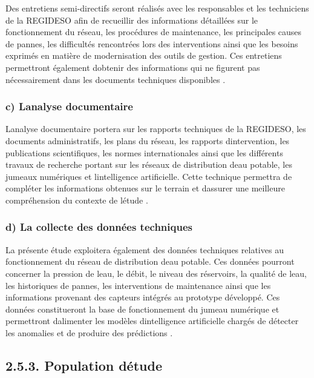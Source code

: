 \documentclass[12pt,a4paper,oneside]{report}
\begin{document}
Des entretiens semi-directifs seront réalisés avec les responsables et
les techniciens de la REGIDESO afin de recueillir des informations
détaillées sur le fonctionnement du réseau, les procédures de
maintenance, les principales causes de pannes, les difficultés
rencontrées lors des interventions ainsi que les besoins exprimés en
matière de modernisation des outils de gestion. Ces entretiens
permettront également d\textquotesingle obtenir des informations qui ne
figurent pas nécessairement dans les documents techniques disponibles
\cite{ref104}.

\subsubsection{c) L\textquotesingle analyse
documentaire}\label{c-lanalyse-documentaire}

L\textquotesingle analyse documentaire portera sur les rapports
techniques de la REGIDESO, les documents administratifs, les plans du
réseau, les rapports d\textquotesingle intervention, les publications
scientifiques, les normes internationales ainsi que les différents
travaux de recherche portant sur les réseaux de distribution
d\textquotesingle eau potable, les jumeaux numériques et
l\textquotesingle intelligence artificielle. Cette technique permettra
de compléter les informations obtenues sur le terrain et
d\textquotesingle assurer une meilleure compréhension du contexte de
l\textquotesingle étude \cite{ref81}.

\subsubsection{d) La collecte des données
techniques}\label{d-la-collecte-des-donnuxe9es-techniques}

La présente étude exploitera également des données techniques relatives
au fonctionnement du réseau de distribution d\textquotesingle eau
potable. Ces données pourront concerner la pression de
l\textquotesingle eau, le débit, le niveau des réservoirs, la qualité de
l\textquotesingle eau, les historiques de pannes, les interventions de
maintenance ainsi que les informations provenant des capteurs intégrés
au prototype développé. Ces données constitueront la base de
fonctionnement du jumeau numérique et permettront
d\textquotesingle alimenter les modèles d\textquotesingle intelligence
artificielle chargés de détecter les anomalies et de produire des
prédictions \cite{ref20}.

\subsection{\texorpdfstring{\textbf{2.5.3. Population
d\textquotesingle étude}}{2.5.3. Population d\textquotesingle étude}}\label{population-duxe9tude}
\end{document}
